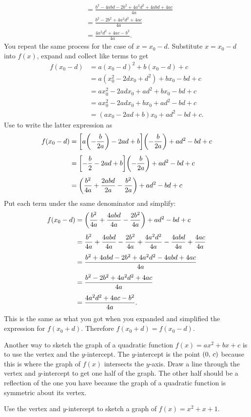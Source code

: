 \documentclass[a4paper,oneside,12pt]{article}
\begin{document}
\begin{problem}
{\begin{solution}
\begin{align*}
&=
\frac{
  b^2 - 4abd - 2b^2 + 4a^2d^2 + 4abd + 4ac
}{
  4a
} \\[4pt]
&=
\frac{
  b^2 - 2b^2 + 4a^2d^2 + 4ac
}{
  4a
} \\[4pt]
&=
\frac{
  4a^2d^2 + 4ac - b^2
}{
  4a
}.
\end{align*}
You repeat the same process for the case of $x = x_0 - d$.  Substitute
$x = x_0 - d$ into $f(x)$, expand and collect like terms to get
\begin{align*}
f(x_0 - d)
&=
a(x_0 - d)^2 + b(x_0 - d) + c \\[4pt]
&=
a(x_0^2 - 2dx_0 + d^2) + bx_0 - bd + c \\[4pt]
&=
ax_0^2 - 2adx_0 + ad^2 + bx_0 - bd + c \\[4pt]
&=
ax_0^2 - 2adx_0 + bx_0 + ad^2 - bd + c \\[4pt]
&=
(ax_0 - 2ad + b)x_0 + ad^2 - bd + c.
\end{align*}
Use  to write the
latter expression as
\begin{align*}
f(x_0 - d)
&=
\squarebracket*{
  a\parenthesis*{-\frac{b}{2a}} - 2ad + b
}
\parenthesis*{-\frac{b}{2a}} + ad^2 - bd + c \\[4pt]
&=
\squarebracket*{
  -\frac{b}{2} - 2ad + b
}
\parenthesis*{-\frac{b}{2a}} + ad^2 - bd + c \\[4pt]
&=
\parenthesis*{
  \frac{b^2}{4a} + \frac{2abd}{2a} - \frac{b^2}{2a}
}
+ ad^2 - bd + c
\end{align*}
Put each term under the same denominator and simplify:
\begin{align*}
f(x_0 - d)
&=
\parenthesis*{
  \frac{b^2}{4a} + \frac{4abd}{4a} - \frac{2b^2}{4a}
}
+ ad^2 - bd + c \\[4pt]
&=
\frac{b^2}{4a} + \frac{4abd}{4a} - \frac{2b^2}{4a}
+ \frac{4a^2d^2}{4a} - \frac{4abd}{4a} + \frac{4ac}{4a} \\[4pt]
&=
\frac{
  b^2 + 4abd - 2b^2 + 4a^2d^2 - 4abd + 4ac
}{
  4a
} \\[4pt]
&=
\frac{
  b^2 - 2b^2 + 4a^2d^2 + 4ac
}{
  4a
} \\[4pt]
&=
\frac{
  4a^2d^2 + 4ac - b^2
}{
  4a
}.
\end{align*}
This is the same as what you got when you expanded and simplified the
expression for $f(x_0 + d)$.  Therefore $f(x_0 + d) = f(x_0 - d)$.
\end{solution}
}{}

\item Another way to sketch the graph of a quadratic function
  $f(x) = ax^2 + bx + c$ is to use the vertex and the $y$-intercept.
  The $y$-intercept is the point $\tuple{0}{c}$ because this is where
  the graph of $f(x)$ intersects the $y$-axis.  Draw a line through
  the vertex and $y$-intercept to get one half of the graph.  The
  other half should be a reflection of the one you have because the
  graph of a quadratic function is symmetric about its vertex.
  \begin{packedenum}
  \item\label{subprob:graph_sketch_vertex_y_intercept}
    Use the vertex and $y$-intercept to sketch a graph of
    $f(x) = x^2 + x + 1$.


\end{packedenum}
\end{problem}
\end{document}
